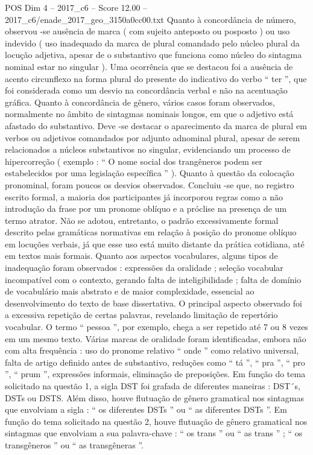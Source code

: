 \begin{textsample}{POS Dim 4 – 2017\_c6 – Score 12.00 – 2017\_c6/enade\_2017\_geo\_3150a0cc00.txt}
Quanto à concordância de número, observou -se ausência de marca ( com sujeito anteposto ou posposto ) ou uso indevido ( uso inadequado da marca de plural comandado pelo núcleo plural da locução adjetiva, apesar de o substantivo que funciona como núcleo do sintagma nominal estar no singular ).
Uma ocorrência que se destacou foi a ausência de acento circunflexo na forma plural do presente do indicativo do verbo “ ter ”, que foi considerada como um desvio na concordância verbal e não na acentuação gráfica.
Quanto à concordância de gênero, vários casos foram observados, normalmente no âmbito de sintagmas nominais longos, em que o adjetivo está afastado do substantivo.
Deve -se destacar o aparecimento da marca de plural em verbos ou adjetivos comandados por adjunto adnominal plural, apesar de serem relacionados a núcleos substantivos no singular, evidenciando um processo de hipercorreção ( exemplo : “ O nome social dos trangêneros podem ser estabelecidos por uma legislação específica ” ).
Quanto à questão da colocação pronominal, foram poucos os desvios observados.
Concluiu -se que, no registro escrito formal, a maioria dos participantes já incorporou regras como a não introdução da frase por um pronome oblíquo e a próclise na presença de um termo atrator.
Não se adotou, entretanto, o padrão excessivamente formal descrito pelas gramáticas normativas em relação à posição do pronome oblíquo em locuções verbais, já que esse uso está muito distante da prática cotidiana, até em textos mais formais.
Quanto aos aspectos vocabulares, alguns tipos de inadequação foram observados : expressões da oralidade ; seleção vocabular incompatível com o contexto, gerando falta de inteligibilidade ; falta de domínio de vocabulário mais abstrato e de maior complexidade, essencial ao desenvolvimento do texto de base dissertativa.
O principal aspecto observado foi a excessiva repetição de certas palavras, revelando limitação de repertório vocabular.
O termo “ pessoa ”, por exemplo, chega a ser repetido até 7 ou 8 vezes em um mesmo texto.
Várias marcas de oralidade foram identificadas, embora não com alta frequência : uso do pronome relativo “ onde ” como relativo universal, falta de artigo definido antes de substantivo, reduções como “ tá ”, “ pra ”, “ pro ”, “ prum ”, expressões informais, eliminação de preposições.
Em função do tema solicitado na questão 1, a sigla DST foi grafada de diferentes maneiras : DST´s, DSTs ou DSTS.
Além disso, houve flutuação de gênero gramatical nos sintagmas que envolviam a sigla : “ os diferentes DSTs ” ou “ as diferentes DSTs ”.
Em função do tema solicitado na questão 2, houve flutuação de gênero gramatical nos sintagmas que envolviam a sua palavra-chave : “ os trans ” ou “ as trans ” ; “ os transgêneros ” ou “ as transgêneras ”.

\end{textsample}
